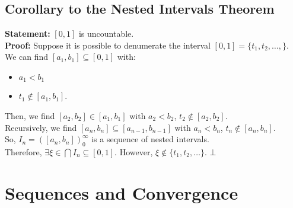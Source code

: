 \documentclass[10pt]{extarticle}
\begin{document}
  \subsection{Corollary to the Nested Intervals Theorem}%
  \textbf{Statement:} $[0,1]$ is uncountable.\\

  \textbf{Proof:} Suppose it is possible to denumerate the interval $[0,1] = \{t_1,t_2,\dots,\}$.\\

    We can find $[a_1,b_1]\subseteq [0,1]$ with:
    \begin{itemize}
      \item $a_1 < b_1$
      \item $t_1\notin [a_1,b_1]$.
    \end{itemize}
    Then, we find $[a_2,b_2]\in [a_1,b_1]$ with $a_2 < b_2$, $t_2\notin [a_2,b_2]$.\\

    Recursively, we find $[a_n,b_n]\subseteq [a_{n-1},b_{n-1}]$ with $a_n < b_n$, $t_n\notin [a_n,b_n]$.\\

    So, $I_n = ([a_n,b_n])_{0}^{\infty}$ is a sequence of nested intervals.\\

    Therefore, $\exists \xi\in \bigcap I_n \subseteq [0,1]$. However, $\xi \notin \{t_1,t_2,\dots\}$. $\bot$
    
  \section{Sequences and Convergence}%
\end{document}

